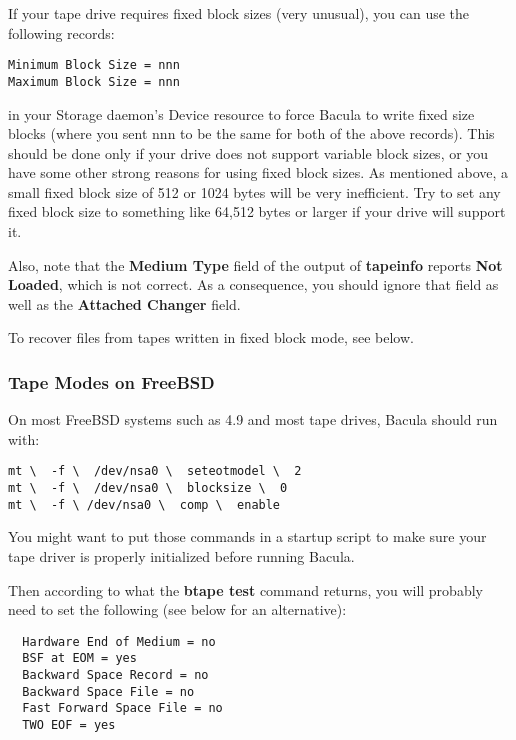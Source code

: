 If your tape drive requires fixed block sizes (very unusual), you can use the
following records: 

\footnotesize
\begin{verbatim}
Minimum Block Size = nnn
Maximum Block Size = nnn
\end{verbatim}
\normalsize

in your Storage daemon's Device resource to force Bacula to write fixed size
blocks (where you sent nnn to be the same for both of the above records). This
should be done only if your drive does not support variable block sizes, or
you have some other strong reasons for using fixed block sizes. As mentioned
above, a small fixed block size of 512 or 1024 bytes will be very inefficient.
Try to set any fixed block size to something like 64,512 bytes or larger if
your drive will support it. 

Also, note that the {\bf Medium Type} field of the output of {\bf tapeinfo}
reports {\bf Not Loaded}, which is not correct. As a consequence, you should
ignore that field as well as the {\bf Attached Changer} field. 

To recover files from tapes written in fixed block mode, see below. 
\label{FreeBSDTapes}

\subsubsection*{Tape Modes on FreeBSD}

On most FreeBSD systems such as 4.9 and most tape drives, Bacula should run
with: 

\footnotesize
\begin{verbatim}
mt \  -f \  /dev/nsa0 \  seteotmodel \  2
mt \  -f \  /dev/nsa0 \  blocksize \  0
mt \  -f \ /dev/nsa0 \  comp \  enable
\end{verbatim}
\normalsize

You might want to put those commands in a startup script to make sure your
tape driver is properly initialized before running Bacula. 

Then according to what the {\bf btape test} command returns, you will probably
need to set the following (see below for an alternative): 

\footnotesize
\begin{verbatim}
  Hardware End of Medium = no
  BSF at EOM = yes
  Backward Space Record = no
  Backward Space File = no
  Fast Forward Space File = no
  TWO EOF = yes
\end{verbatim}
\normalsize

